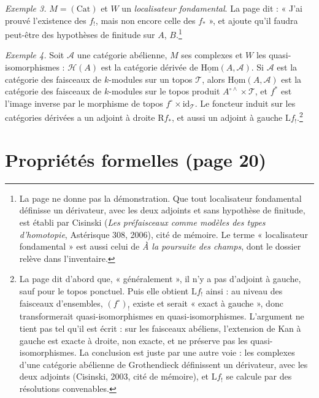 \documentclass[11pt,a4paper]{article}
\begin{document}
\emph{Exemple 3.} $M = (\mathrm{Cat})$ et $W$ un \emph{localisateur
fondamental}. La page dit : « J'ai prouvé l'existence des $f_{!}$, mais non
encore celle des $f_{*}$ », et ajoute qu'il faudra peut-être des hypothèses
de finitude sur $A$, $B$.\footnote{La page ne donne pas la démonstration.
Que tout localisateur fondamental définisse un dérivateur, avec les deux
adjoints et sans hypothèse de finitude, est établi par Cisinski
(\emph{Les préfaisceaux comme modèles des types d'homotopie}, Astérisque
308, 2006), cité de mémoire. Le terme « localisateur fondamental » est aussi
celui de \emph{À la poursuite des champs}, dont le dossier relève dans
l'inventaire.}

\emph{Exemple 4.} Soit $\mathcal A$ une catégorie abélienne, $M$ ses
complexes et $W$ les quasi-isomorphismes : $\mathcal H(A)$ est la catégorie
dérivée de $\underline{\mathrm{Hom}}(A, \mathcal A)$. Si $\mathcal A$ est la
catégorie des faisceaux de $k$-modules sur un topos $\mathcal T$, alors
$\underline{\mathrm{Hom}}(A, \mathcal A)$ est la catégorie des faisceaux de
$k$-modules sur le topos produit $A^{\circ\wedge} \times \mathcal T$, et
$f^{*}$ est l'image inverse par le morphisme de topos $f^{\circ} \times
\mathrm{id}_{\mathcal T}$. Le foncteur induit sur les catégories dérivées a
un adjoint à droite $\mathrm{R}f_{*}$, et aussi un adjoint à gauche
$\mathrm{L}f_{!}$.\footnote{La page dit d'abord que, « généralement », il
n'y a pas d'adjoint à gauche, sauf pour le topos ponctuel. Puis elle obtient
$\mathrm{L}f_{!}$ ainsi : au niveau des faisceaux d'ensembles, $(f^{\circ})_{!}$
existe et serait « exact à gauche », donc transformerait quasi-isomorphismes
en quasi-isomorphismes. L'argument ne tient pas tel qu'il est écrit : sur
les faisceaux abéliens, l'extension de Kan à gauche est exacte à droite, non
exacte, et ne préserve pas les quasi-isomorphismes. La conclusion est juste
par une autre voie : les complexes d'une catégorie abélienne de Grothendieck
définissent un dérivateur, avec les deux adjoints (Cisinski, 2003, cité de
mémoire), et $\mathrm{L}f_{!}$ se calcule par des résolutions convenables.}

\section*{Propriétés formelles (page 20)}
\end{document}
